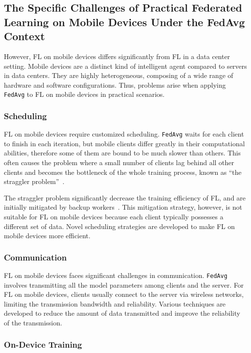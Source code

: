 \documentclass[conference]{IEEEtran}
\begin{document}
\subsection{The Specific Challenges of Practical Federated Learning on
Mobile Devices Under the FedAvg Context}

However, FL on mobile devices differs significantly from
FL in a data center setting.
Mobile devices are a distinct kind of intelligent agent compared to
servers in data centers.
They are highly heterogeneous,
composing of a wide range of hardware and software configurations.
Thus, problems arise when applying \verb|FedAvg| to FL on mobile devices in
practical scenarios.

\subsubsection{Scheduling}

FL on mobile devices require customized scheduling.
\verb|FedAvg| waits for each client to finish in each iteration,
but mobile clients differ greatly in their computational abilities,
therefore some of them are bound to be much slower than others.
This often causes the problem where
a small number of clients lag behind all other clients and
becomes the bottleneck of the whole training process,
known as
``the straggler problem''~\cite{chen2020asynchronous,zheng2017asynchronous}.

The straggler problem significantly decrease the training efficiency of FL,
and are initially mitigated by backup workers~\cite{chen2016revisiting}.
This mitigation strategy, however,
is not suitable for FL on mobile devices because
each client typically possesses a different set of data.
Novel scheduling strategies are developed to
make FL on mobile devices more efficient.

\subsubsection{Communication}

FL on mobile devices faces significant challenges in communication.
\verb|FedAvg| involves transmitting all the model parameters among
clients and the server.
For FL on mobile devices,
clients usually connect to the server via wireless networks,
limiting the transmission bandwidth and reliability.
Various techniques are developed to reduce the amount of data transmitted
and improve the reliability of the transmission.

\subsubsection{On-Device Training}
\end{document}
